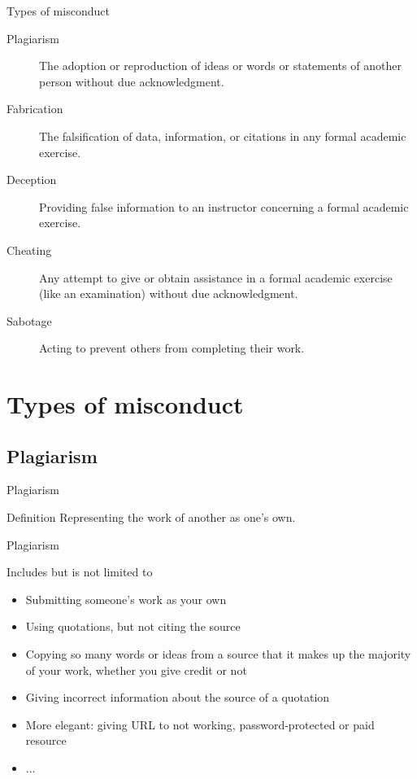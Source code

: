 	\begin{frame}{Types of misconduct}

		\begin{description}
			\item[Plagiarism]
				The adoption or reproduction of ideas or words or statements of another person without due acknowledgment.
			\item[Fabrication]
				The falsification of data, information, or citations in any formal academic exercise.
			\item[Deception]
				Providing false information to an instructor concerning a formal academic exercise.
			\item[Cheating]
				Any attempt to give or obtain assistance in a formal academic exercise (like an examination) without due acknowledgment.
			\item[Sabotage]
				Acting to prevent others from completing their work.
		\end{description}

	\end{frame}

\section{Types of misconduct}

	\subsection{Plagiarism}

		\begin{frame}{Plagiarism}
			
			\begin{block}{Definition}
				Representing the work of another as one’s own.
			\end{block}	

		\end{frame}

		\begin{frame}{Plagiarism}
			
			Includes but is not limited to

			\begin{itemize}
				\item 
					Submitting someone's work as your own
				\item 
					Using quotations, but not citing the source
				\item 
					Copying so many words or ideas from a source that it makes up the majority of your work, whether you give credit or not
				\item 
					Giving incorrect information about the source of a quotation
				\item 
					More elegant: giving URL to not working, password-protected or paid resource
				\item 
					$\ldots$
			\end{itemize}

		\end{frame}

